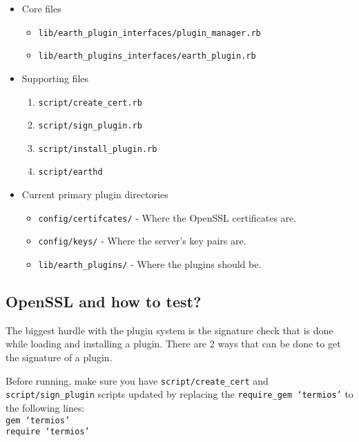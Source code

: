 \documentclass{article}
\begin{document}
\begin{itemize}
	\item Core files
		\begin{itemize}
			\item \texttt{lib/earth\_plugin\_interfaces/plugin\_manager.rb}
			\item \texttt{lib/earth\_plugins\_interfaces/earth\_plugin.rb}
		\end{itemize}
	\item Supporting files
		\begin{enumerate}
			\item \texttt{script/create\_cert.rb}
			\item \texttt{script/sign\_plugin.rb}
			\item \texttt{script/install\_plugin.rb}
			\item \texttt{script/earthd}  
		\end{enumerate}	
	\item Current primary plugin directories
		\begin{itemize}
			\item \texttt{config/certifcates/} - Where the OpenSSL certificates are. 
			\item \texttt{config/keys/} - Where the server's key pairs are.
			\item \texttt{lib/earth\_plugins/} - Where the plugins should be.
		\end{itemize}	
\end{itemize}

\subsection*{OpenSSL and how to test?}

The biggest hurdle with the plugin system is the signature check that is done while loading and installing a plugin. There are 2 ways that can be done to get the signature of a plugin. 

Before running, make sure you have \texttt{script/create\_cert} and \texttt{script/sign\_plugin} scripts updated by replacing the \texttt{require\_gem `termios'} to the following lines: \\

\texttt{gem `termios'} \\
\texttt{require `termios'}
\end{document}
